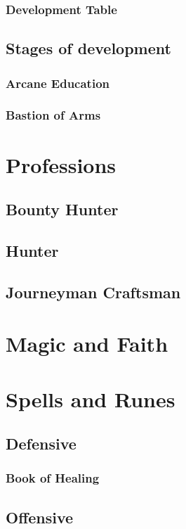 \documentclass[12pt]{article}
\begin{document}
\subsubsection{Development Table}
\subsection{Stages of development}
\subsubsection{Arcane Education}
\subsubsection{Bastion of Arms}
\section{Professions}
\subsection{Bounty Hunter}
\subsection{Hunter}
\subsection{Journeyman Craftsman}
        \newpage
\section{Magic and Faith}
\section{Spells and Runes}
\subsection{Defensive}
\subsubsection{Book of Healing}
\subsection{Offensive}
\end{document}
